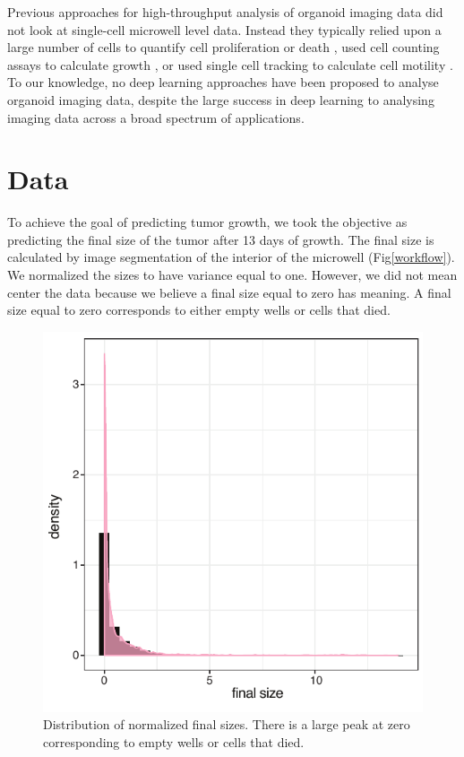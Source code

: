 \documentclass[10pt,twocolumn,letterpaper]{article}
\begin{document}
Previous approaches for high-throughput analysis of organoid imaging data did not look at single-cell microwell level data.  Instead they typically relied upon a large number of cells to quantify cell proliferation or death \cite{jabs2017screening},  used cell counting assays to calculate growth \cite{sebrell2018live}, or used single cell tracking to calculate cell motility \cite{geum2016epidermal}.  To our knowledge, no deep learning approaches have been proposed to analyse organoid imaging data, despite the large success in deep learning to analysing imaging data across a broad spectrum of applications.

\section{Data}

To achieve the goal of predicting tumor growth, we took the objective as predicting the final size of the tumor after 13 days of growth.  The final size is calculated by image segmentation of the interior of the microwell (Fig\ref{workflow}).  We normalized the sizes to have variance equal to one.  However, we did not mean center the data because we believe a final size equal to zero has meaning.  A final size equal to zero corresponds to either empty wells or cells that died.  

\begin{figure}[b!]
\begin{center}
 \includegraphics[width=0.8\linewidth]{figures/final_day_hyst2_area_density.pdf}
\end{center}
   \caption{Distribution of normalized final sizes.  There is a large peak at zero corresponding to empty wells or cells that died.}
\label{final_size_dist}
\end{figure}
\end{document}
